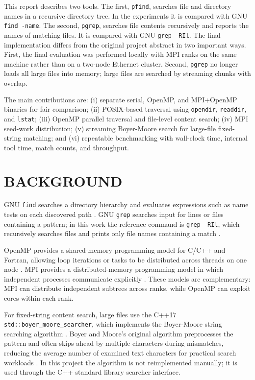 \documentclass[twocolumn,10pt]{asme2e}
\begin{document}
This report describes two tools. The first, \texttt{pfind}, searches file and directory names in a recursive directory tree. In the experiments it is compared with GNU \texttt{find -name}. The second, \texttt{pgrep}, searches file contents recursively and reports the names of matching files. It is compared with GNU \texttt{grep -RIl}. The final implementation differs from the original project abstract in two important ways. First, the final evaluation was performed locally with MPI ranks on the same machine rather than on a two-node Ethernet cluster. Second, \texttt{pgrep} no longer loads all large files into memory; large files are searched by streaming chunks with overlap.

The main contributions are: (i) separate serial, OpenMP, and MPI+OpenMP binaries for fair comparison; (ii) POSIX-based traversal using \texttt{opendir}, \texttt{readdir}, and \texttt{lstat}; (iii) OpenMP parallel traversal and file-level content search; (iv) MPI seed-work distribution; (v) streaming Boyer-Moore search for large-file fixed-string matching; and (vi) repeatable benchmarking with wall-clock time, internal tool time, match counts, and throughput.

\section*{BACKGROUND}

GNU \texttt{find} searches a directory hierarchy and evaluates expressions such as name tests on each discovered path \cite{gnu_find}. GNU \texttt{grep} searches input for lines or files containing a pattern; in this work the reference command is \texttt{grep -RIl}, which recursively searches files and prints only file names containing a match \cite{gnu_grep}.

OpenMP provides a shared-memory programming model for C/C++ and Fortran, allowing loop iterations or tasks to be distributed across threads on one node \cite{openmp_spec}. MPI provides a distributed-memory programming model in which independent processes communicate explicitly \cite{mpi_standard}. These models are complementary: MPI can distribute independent subtrees across ranks, while OpenMP can exploit cores within each rank.

For fixed-string content search, large files use the C++17 \texttt{std::boyer\_moore\_searcher}, which implements the Boyer-Moore string searching algorithm \cite{cpp_bm}. Boyer and Moore's original algorithm preprocesses the pattern and often skips ahead by multiple characters during mismatches, reducing the average number of examined text characters for practical search workloads \cite{boyer_moore}. In this project the algorithm is not reimplemented manually; it is used through the C++ standard library searcher interface.
\end{document}
